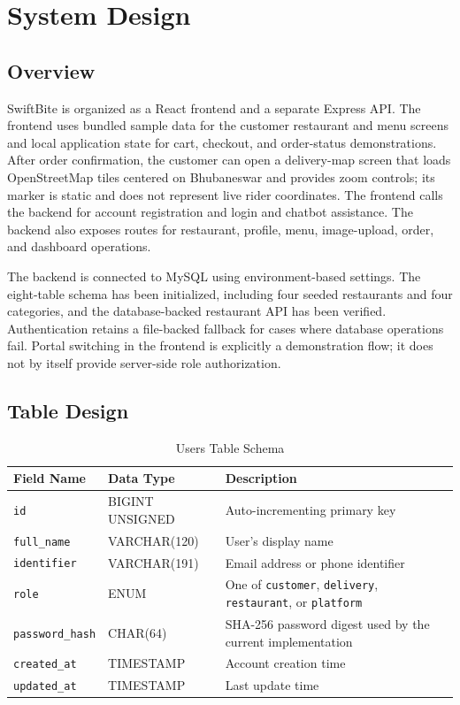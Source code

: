 \chapter{System Design}

\section{Overview}

SwiftBite is organized as a React frontend and a separate Express API. The frontend uses bundled sample data for the customer restaurant and menu screens and local application state for cart, checkout, and order-status demonstrations. After order confirmation, the customer can open a delivery-map screen that loads OpenStreetMap tiles centered on Bhubaneswar and provides zoom controls; its marker is static and does not represent live rider coordinates. The frontend calls the backend for account registration and login and chatbot assistance. The backend also exposes routes for restaurant, profile, menu, image-upload, order, and dashboard operations.

The backend is connected to MySQL using environment-based settings. The eight-table schema has been initialized, including four seeded restaurants and four categories, and the database-backed restaurant API has been verified. Authentication retains a file-backed fallback for cases where database operations fail. Portal switching in the frontend is explicitly a demonstration flow; it does not by itself provide server-side role authorization.

\section{Table Design}

\begin{table}[H]
\centering
\caption{Users Table Schema}
\label{tab:users}
\begin{tabular}{|l|l|p{7cm}|}
\hline
\textbf{Field Name} & \textbf{Data Type} & \textbf{Description} \\ \hline
\texttt{id} & BIGINT UNSIGNED & Auto-incrementing primary key \\ \hline
\texttt{full\_name} & VARCHAR(120) & User's display name \\ \hline
\texttt{identifier} & VARCHAR(191) & Email address or phone identifier \\ \hline
\texttt{role} & ENUM & One of \texttt{customer}, \texttt{delivery}, \texttt{restaurant}, or \texttt{platform} \\ \hline
\texttt{password\_hash} & CHAR(64) & SHA-256 password digest used by the current implementation \\ \hline
\texttt{created\_at} & TIMESTAMP & Account creation time \\ \hline
\texttt{updated\_at} & TIMESTAMP & Last update time \\ \hline
\end{tabular}
\end{table}

